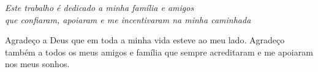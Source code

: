 \documentclass[
	12pt,				%
	openright,			%
	oneside,			%
	a4paper,			%
	chapter=TITLE,		%
	section=TITLE,		%
	subsection=TITLE,	%
	subsubsection=TITLE,%
	english,			%
	brazil				%
	]{abntex2}
\theoremstyle{definition}
\begin{document}
\nocite{Vrs:2018}

\frenchspacing 



\imprimircapa

\imprimirfolhaderosto


\begin{fichacatalografica}
    
\end{fichacatalografica}


\newpage

%
\begin{folhadeaprovacao}
\imprimirfolhadeaprovacao
\end{folhadeaprovacao}





\begin{dedicatoria}
   \vspace*{\fill}
   \flushright
   \textit{Este trabalho é dedicado a minha família e amigos\\
   que confiaram, apoiaram e me incentivaram na minha caminhada}
\end{dedicatoria}

\begin{agradecimentos}

Agradeço a Deus que em toda a minha vida esteve ao meu lado. Agradeço também a todos os meus amigos e família que sempre acreditaram e me apoiaram nos meus sonhos.

\end{agradecimentos}
\end{document}
